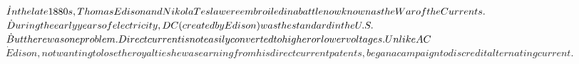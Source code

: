 \documentclass[preview]{standalone}
\begin{document}
\centering $\dot In the late 1880s, Thomas Edison and Nikola Tesla were embroiled in a battle now known as the War of the Currents.\newline$ $\dot During the early years of electricity, DC (created by Edison) was the standard in the U.S.\newline$ $\dot But there was one problem. Direct current is not easily converted to higher or lower voltages. Unlike AC\newline$ $\dot Edison, not wanting to lose the royalties he was earning from his direct current patents, began a campaign to discredit alternating current.$
\end{document}
